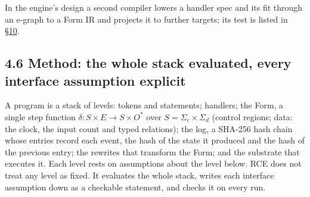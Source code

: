 \documentclass[10pt,letterpaper]{article}
\begin{document}
In the engine's design a second compiler lowers a handler spec and its
fit through an e-graph to a Form IR and projects it to further targets;
its test is listed in
\href{https://research.openie.dev/papers/rce/\#10-work-to-finish}{§10}.

\subsection{4.6 Method: the whole stack evaluated, every interface
assumption
explicit}\label{method-the-whole-stack-evaluated-every-interface-assumption-explicit}

A program is a stack of levels: tokens and statements; handlers; the
Form, a single step function \(\delta : S \times E \to S \times O^*\)
over \(S = \Sigma_c \times \Sigma_d\) (control regions; data: the clock,
the input count and typed relations); the log, a SHA-256 hash chain
whose entries record each event, the hash of the state it produced and
the hash of the previous entry; the rewrites that transform the Form;
and the substrate that executes it. Each level rests on assumptions
about the level below. RCE does not treat any level as fixed. It
evaluates the whole stack, writes each interface assumption down as a
checkable statement, and checks it on every run.
\end{document}

